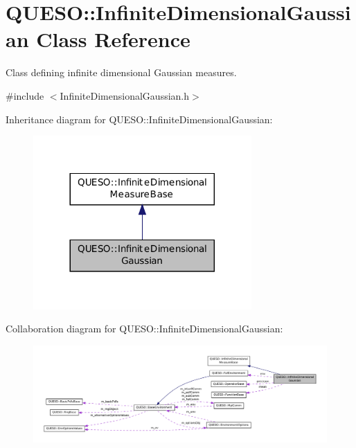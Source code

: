 \hypertarget{class_q_u_e_s_o_1_1_infinite_dimensional_gaussian}{\section{Q\-U\-E\-S\-O\-:\-:Infinite\-Dimensional\-Gaussian Class Reference}
\label{class_q_u_e_s_o_1_1_infinite_dimensional_gaussian}
}


Class defining infinite dimensional Gaussian measures.  




{\ttfamily \#include $<$Infinite\-Dimensional\-Gaussian.\-h$>$}



Inheritance diagram for Q\-U\-E\-S\-O\-:\-:Infinite\-Dimensional\-Gaussian\-:
\nopagebreak
\begin{figure}[H]
\begin{center}
\leavevmode
\includegraphics[width=236pt]{class_q_u_e_s_o_1_1_infinite_dimensional_gaussian__inherit__graph}
\end{center}
\end{figure}


Collaboration diagram for Q\-U\-E\-S\-O\-:\-:Infinite\-Dimensional\-Gaussian\-:
\nopagebreak
\begin{figure}[H]
\begin{center}
\leavevmode
\includegraphics[width=350pt]{class_q_u_e_s_o_1_1_infinite_dimensional_gaussian__coll__graph}
\end{center}
\end{figure}
